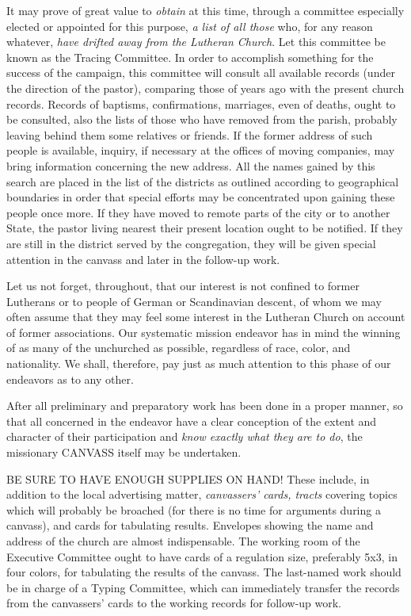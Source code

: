 \documentclass[
]{book}
\begin{document}
It may prove of great value to \emph{obtain} at this time, through a committee especially elected or appointed for this purpose, \emph{a list of all those} who, for any reason whatever, \emph{have drifted away from the Lutheran Church}. Let this committee be known as the Tracing Committee. In order to accomplish something for the success of the campaign, this committee will consult all available records (under the direction of the pastor), comparing those of years ago with the present church records. Records of baptisms, confirmations, marriages, even of deaths, ought to be consulted, also the lists of those who have removed from the parish, probably leaving behind them some relatives or friends. If the former address of such people is available, inquiry, if necessary at the offices of moving companies, may bring information concerning the new address. All the names gained by this search are placed in the list of the districts as outlined according to geographical boundaries in order that special efforts may be concentrated upon gaining these people once more. If they have moved to remote parts of the city or to another State, the pastor living nearest their present location ought to be notified. If they are still in the district served by the congregation, they will be given special attention in the canvass and later in the follow-up work.

Let us not forget, throughout, that our interest is not confined to former Lutherans or to people of German or Scandinavian descent, of whom we may often assume that they may feel some interest in the Lutheran Church on account of former associations. Our systematic mission endeavor has in mind the winning of as many of the unchurched as possible, regardless of race, color, and nationality. We shall, therefore, pay just as much attention to this phase of our endeavors as to any other.

After all preliminary and preparatory work has been done in a proper manner, so that all concerned in the endeavor have a clear conception of the extent and character of their participation and \emph{know exactly what they are to do}, the missionary CANVASS itself may be undertaken.

BE SURE TO HAVE ENOUGH SUPPLIES ON HAND! These include, in addition to the local advertising matter, \emph{canvassers' cards, tracts} covering topics which will probably be broached (for there is no time for arguments during a canvass), and cards for tabulating results. Envelopes showing the name and address of the church are almost indispensable. The working room of the Executive Committee ought to have cards of a regulation size, preferably 5x3, in four colors, for tabulating the results of the canvass. The last-named work should be in charge of a Typing Committee, which can immediately transfer the records from the canvassers' cards to the working records for follow-up work.
\end{document}
